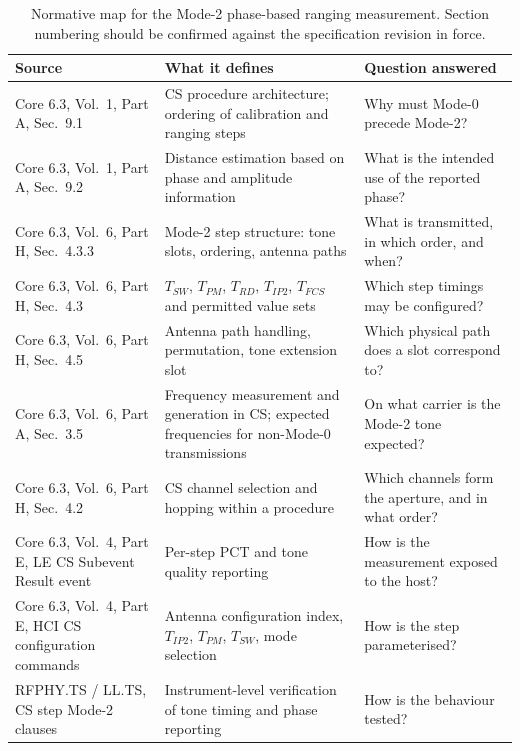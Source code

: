 \documentclass[11pt,a4paper]{article}
\newcommand{\PCT}{\mathrm{PCT}}
\newcommand{\Tsw}{T_{SW}}
\newcommand{\Tpm}{T_{PM}}
\newcommand{\Trd}{T_{RD}}
\newcommand{\Tipp}{T_{IP2}}
\begin{document}
\begin{table}[h]
\caption{Normative map for the Mode-2 phase-based ranging measurement. Section numbering should be
confirmed against the specification revision in force.}
\label{tab:normmap}
\centering\small
\begin{tabular}{@{}L{42mm}L{51mm}L{51mm}@{}}
\toprule
Source & What it defines & Question answered \\
\midrule
Core 6.3, Vol.\ 1, Part A, Sec.\ 9.1 & CS procedure architecture; ordering of calibration and ranging steps & Why must Mode-0 precede Mode-2? \\
Core 6.3, Vol.\ 1, Part A, Sec.\ 9.2 & Distance estimation based on phase and amplitude information & What is the intended use of the reported phase? \\
Core 6.3, Vol.\ 6, Part H, Sec.\ 4.3.3 & Mode-2 step structure: tone slots, ordering, antenna paths & What is transmitted, in which order, and when? \\
Core 6.3, Vol.\ 6, Part H, Sec.\ 4.3 & $\Tsw$, $\Tpm$, $\Trd$, $\Tipp$, $T_{FCS}$ and permitted value sets & Which step timings may be configured? \\
Core 6.3, Vol.\ 6, Part H, Sec.\ 4.5 & Antenna path handling, permutation, tone extension slot & Which physical path does a slot correspond to? \\
Core 6.3, Vol.\ 6, Part A, Sec.\ 3.5 & Frequency measurement and generation in CS; expected frequencies for non-Mode-0 transmissions & On what carrier is the Mode-2 tone expected? \\
Core 6.3, Vol.\ 6, Part H, Sec.\ 4.2 & CS channel selection and hopping within a procedure & Which channels form the aperture, and in what order? \\
Core 6.3, Vol.\ 4, Part E, LE CS Subevent Result event & Per-step $\PCT$ and tone quality reporting & How is the measurement exposed to the host? \\
Core 6.3, Vol.\ 4, Part E, HCI CS configuration commands & Antenna configuration index, $\Tipp$, $\Tpm$, $\Tsw$, mode selection & How is the step parameterised? \\
RFPHY.TS / LL.TS, CS step Mode-2 clauses & Instrument-level verification of tone timing and phase reporting & How is the behaviour tested? \\
\bottomrule
\end{tabular}
\end{table}
\end{document}
